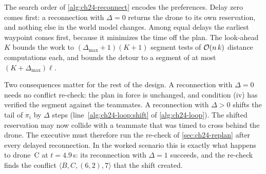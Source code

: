 \begin{algorithm}[htb]
\caption{Reconnection search along the nominal path}
\label{alg:ch24-reconnect}
\end{algorithm}

The search order of \cref{alg:ch24-reconnect} encodes the preferences.
Delay zero comes first: a reconnection with $\Delta = 0$ returns the drone
to its own reservation, and nothing else in the world model changes. Among
equal delays the earliest waypoint comes first, because it minimizes the
time off the plan.
The look-ahead $K$ bounds the work to $(\Delta_{\max} + 1)(K + 1)$ segment
tests of $\mathcal{O}\!\left(n\,k\right)$ distance computations each, and bounds the detour to
a segment of at most $(K + \Delta_{\max})\ell$.

Two consequences matter for the rest of the design. A reconnection with
$\Delta = 0$ needs no conflict re-check: the plan in force is unchanged,
and condition (iv) has verified the segment against the teammates. A
reconnection with $\Delta > 0$ shifts the tail of $\pi_i$ by $\Delta$ steps
(line~\ref{alg:ch24-loop:shift} of \cref{alg:ch24-loop}). The shifted
reservation may now collide with a teammate that was timed to cross behind
the drone. The executive must therefore run the re-check of
\cref{sec:ch24-replan} after every delayed reconnection. In the worked
scenario this is exactly what happens to drone~C at $t = 4.9$\,s: its
reconnection with $\Delta = 1$ succeeds, and the re-check finds the conflict
$\langle B, C, (6,2), 7 \rangle$ that the shift created.

